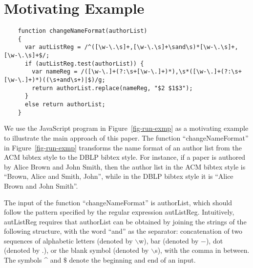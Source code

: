 
\section{Motivating Example}\label{sec:mot}

\begin{figure*}[htbp]
\begin{center}
{
\begin{verbatim}
    function changeNameFormat(authorList)
    {
      var autListReg = /^([\w-\.\s]+,[\w-\.\s]+\sand\s)*[\w-\.\s]+,[\w-\.\s]+$/;
      if (autListReg.test(authorList)) {
        var nameReg = /([\w-\.]+(?:\s+[\w-\.]+)*),\s*([\w-\.]+(?:\s+[\w-\.]+)*)((\s+and\s+)|$)/g;
        return authorList.replace(nameReg, "$2 $1$3");
      }
      else return authorList;
    }
\end{verbatim}
}
\end{center}
\caption{Change the name format of an author list: A motivating example}
\label{fig-run-exmp}
\end{figure*}


We use the JavaScript program in Figure~\ref{fig-run-exmp} as a motivating example to illustrate the main approach of this paper. 
The function ``changeNameFormat''  in Figure~\ref{fig-run-exmp} transforms the name format of an author list from the ACM bibtex style to the DBLP bibtex style. For instance,  if a paper is authored by Alice Brown and John Smith, then the author list in the ACM bibtex style is ``Brown, Alice and Smith, John'', while  in the DBLP bibtex style it is ``Alice Brown and John Smith''. 

The input of the function ``changeNameFormat'' is {\sf authorList}, which should follow the pattern specified by the regular expression {\sf autListReg}. Intuitively, {\sf autListReg} requires that {\sf authorList} can be obtained by joining the strings of the following structure, with the word ``and'' as the separator: concatenation of two sequences of alphabetic letters (denoted by $\backslash$w), bar (denoted by $-$), dot (denoted by $.$), or the blank symbol (denoted by $\backslash$s), with the comma in between. The symbols \^{} and $\$$ denote the beginning and end of an input.

